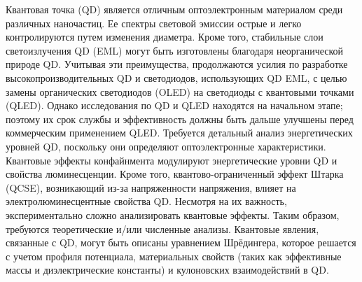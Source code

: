 \documentclass[a4paper,14pt]{extarticle}
\begin{document}
Квантовая точка (QD) является отличным оптоэлектронным материалом среди различных наночастиц. Ее спектры световой эмиссии острые и легко контролируются путем изменения диаметра. Кроме того, стабильные слои светоизлучения QD (EML) могут быть изготовлены благодаря неорганической природе QD. Учитывая эти преимущества, продолжаются усилия по разработке высокопроизводительных QD и светодиодов, использующих QD EML, с целью замены органических светодиодов (OLED) на светодиоды с квантовыми точками (QLED). Однако исследования по QD и QLED находятся на начальном этапе; поэтому их срок службы и эффективность должны быть дальше улучшены перед коммерческим применением QLED. Требуется детальный анализ энергетических уровней QD, поскольку они определяют оптоэлектронные характеристики. Квантовые эффекты конфайнмента модулируют энергетические уровни QD и свойства люминесценции. Кроме того, квантово-ограниченный эффект Штарка (QCSE), возникающий из-за напряженности напряжения, влияет на электролюминесцентные свойства QD. Несмотря на их важность, экспериментально сложно анализировать квантовые эффекты. Таким образом, требуются теоретические и/или численные анализы. Квантовые явления, связанные с QD, могут быть описаны уравнением Шрёдингера, которое решается с учетом профиля потенциала, материальных свойств (таких как эффективные массы и диэлектрические константы) и кулоновских взаимодействий в QD.
\end{document}
